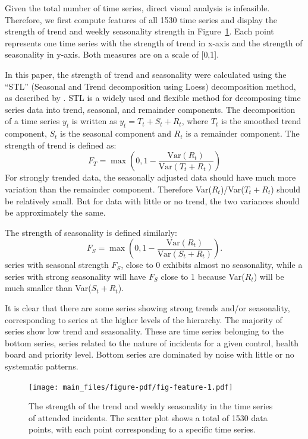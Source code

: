 \documentclass[
  authoryear,
  preprint,
  3p]{elsarticle}
\begin{document}
Given the total number of time series, direct visual analysis is
infeasible. Therefore, we first compute features of all 1530 time series
\citep{m3pca} and display the strength of trend and weekly seasonality
strength in Figure~\ref{fig-feature}. Each point represents one time
series with the strength of trend in x-axis and the strength of
seasonality in y-axis. Both measures are on a scale of {[}0,1{]}.

In this paper, the strength of trend and seasonality were calculated
using the ``STL'' (Seasonal and Trend decomposition using Loess)
decomposition method, as described by \citet{mstl}. STL is a widely used
and flexible method for decomposing time series data into trend,
seasonal, and remainder components. The decomposition of a time series
\(y_t\) is written as \(y_t = T_t + S_{t} + R_t\), where \(T_t\) is the
smoothed trend component, \(S_t\) is the seasonal component and \(R_t\)
is a remainder component. The strength of trend is defined as:
\[F_T = \max\left(0, 1 - \frac{\text{Var}(R_t)}{\text{Var}(T_t+R_t)}\right)\]
For strongly trended data, the seasonally adjusted data should have much
more variation than the remainder component. Therefore
Var(\(R_t\))/Var(\(T_t+R_t\)) should be relatively small. But for data
with little or no trend, the two variances should be approximately the
same.

The strength of seasonality is defined similarly:
\[F_S = \max\left(0, 1 - \frac{\text{Var}(R_t)}{\text{Var}(S_{t}+R_t)}\right).\]
series with seasonal strength \(F_S\), close to 0 exhibits almost no
seasonality, while a series with strong seasonality will have \(F_S\)
close to 1 because Var(\(R_t\)) will be much smaller than
Var(\(S_t+R_t\)).

It is clear that there are some series showing strong trends and/or
seasonality, corresponding to series at the higher levels of the
hierarchy. The majority of series show low trend and seasonality. These
are time series belonging to the bottom series, series related to the
nature of incidents for a given control, health board and priority
level. Bottom series are dominated by noise with little or no systematic
patterns.

\begin{figure}

{\centering \texttt{[image: main\_files/figure-pdf/fig-feature-1.pdf]}

}

\caption{\label{fig-feature}The strength of the trend and weekly
seasonality in the time series of attended incidents. The scatter plot
shows a total of 1530 data points, with each point corresponding to a
specific time series.}

\end{figure}
\end{document}
